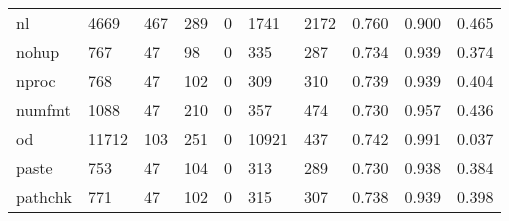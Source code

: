 \begin{longtable}{lp{1.3cm}p{1.3cm}p{1.3cm}p{1.3cm}p{1.3cm}p{1.3cm}p{1.3cm}p{1.3cm}p{1.3cm}}
nl        &                   4669 &                                467 &                               289 &                                0 &                              1741 &                            2172 &                                0.760 &                                  0.900 &                                0.465 \\
nohup     &                    767 &                                 47 &                                98 &                                0 &                               335 &                             287 &                                0.734 &                                  0.939 &                                0.374 \\
nproc     &                    768 &                                 47 &                               102 &                                0 &                               309 &                             310 &                                0.739 &                                  0.939 &                                0.404 \\
numfmt    &                   1088 &                                 47 &                               210 &                                0 &                               357 &                             474 &                                0.730 &                                  0.957 &                                0.436 \\
od        &                  11712 &                                103 &                               251 &                                0 &                             10921 &                             437 &                                0.742 &                                  0.991 &                                0.037 \\
paste     &                    753 &                                 47 &                               104 &                                0 &                               313 &                             289 &                                0.730 &                                  0.938 &                                0.384 \\
pathchk   &                    771 &                                 47 &                               102 &                                0 &                               315 &                             307 &                                0.738 &                                  0.939 &                                0.398 \\

\end{longtable}
